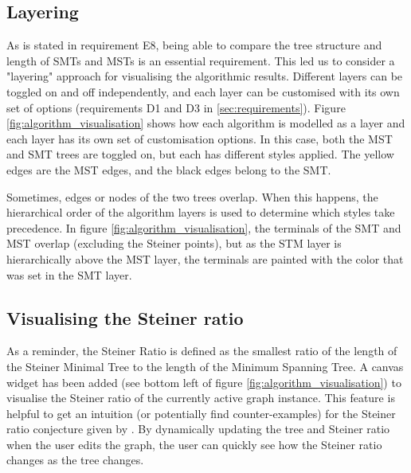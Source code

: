 \documentclass{l4proj}
\begin{document}
\subsection{Layering}
As is stated in requirement E8, being able to compare the tree structure and length of SMTs and MSTs is an essential requirement. This led us to consider a "layering" approach for visualising the algorithmic results. Different layers can be toggled on and off independently, and each layer can be customised with its own set of options (requirements D1 and D3 in \ref{sec:requirements}).
Figure \ref{fig:algorithm_visualisation} shows how each algorithm is modelled as a layer and each layer has its own set of customisation options. In this case, both the MST and SMT trees are toggled on, but each has different styles applied. The yellow edges are the MST edges, and the black edges belong to the SMT.

Sometimes, edges or nodes of the two trees overlap. When this happens, the hierarchical order of the algorithm layers is used to determine which styles take precedence. In figure \ref{fig:algorithm_visualisation}, the terminals of the SMT and MST overlap (excluding the Steiner points), but as the STM layer is hierarchically above the MST layer, the terminals are painted with the color that was set in the SMT layer.

\subsection{Visualising the Steiner ratio}
As a reminder, the Steiner Ratio is defined as the smallest ratio of the length of the Steiner Minimal Tree to the length of the Minimum Spanning Tree.
A canvas widget has been added (see bottom left of figure \ref{fig:algorithm_visualisation}) to visualise the Steiner ratio of the currently active graph instance.
This feature is helpful to get an intuition (or potentially find counter-examples) for the Steiner ratio conjecture given by \cite{Gilbert1968SteinerMT}. By dynamically updating the tree and Steiner ratio when the user edits the graph, the user can quickly see how the Steiner ratio changes as the tree changes.
\end{document}
